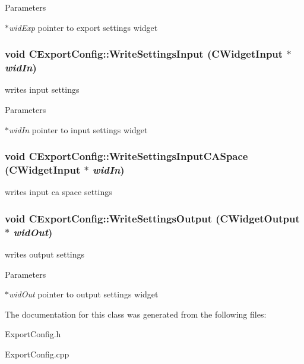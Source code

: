 \begin{DoxyParams}{Parameters}
\item[{\em $\ast$widExp}]pointer to export settings widget \end{DoxyParams}
\hypertarget{classCExportConfig_acfc482ab7655108db7236df00f98d5f3}{
\subsubsection[{WriteSettingsInput}]{\setlength{\rightskip}{0pt plus 5cm}void CExportConfig::WriteSettingsInput ({\bf CWidgetInput} $\ast$ {\em widIn})}}
\label{classCExportConfig_acfc482ab7655108db7236df00f98d5f3}
writes input settings


\begin{DoxyParams}{Parameters}
\item[{\em $\ast$widIn}]pointer to input settings widget \end{DoxyParams}
\hypertarget{classCExportConfig_ad2d3b5c3a8e68084ed6c3b27b846ee55}{
\subsubsection[{WriteSettingsInputCASpace}]{\setlength{\rightskip}{0pt plus 5cm}void CExportConfig::WriteSettingsInputCASpace ({\bf CWidgetInput} $\ast$ {\em widIn})}}
\label{classCExportConfig_ad2d3b5c3a8e68084ed6c3b27b846ee55}
writes input ca space settings \hypertarget{classCExportConfig_ac53bcad1b652575efb5ccc8b804e6fc0}{
\subsubsection[{WriteSettingsOutput}]{\setlength{\rightskip}{0pt plus 5cm}void CExportConfig::WriteSettingsOutput ({\bf CWidgetOutput} $\ast$ {\em widOut})}}
\label{classCExportConfig_ac53bcad1b652575efb5ccc8b804e6fc0}
writes output settings


\begin{DoxyParams}{Parameters}
\item[{\em $\ast$widOut}]pointer to output settings widget \end{DoxyParams}


The documentation for this class was generated from the following files:\begin{DoxyCompactItemize}
\item 
ExportConfig.h\item 
ExportConfig.cpp\end{DoxyCompactItemize}
